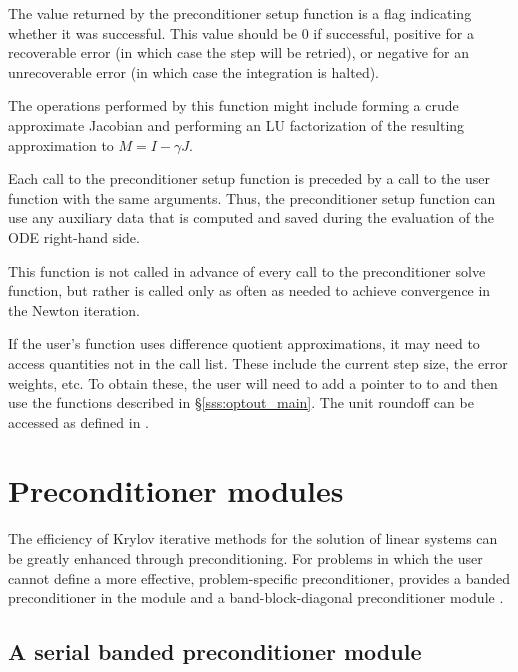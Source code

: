 {
  The value returned by the preconditioner setup function is a flag
  indicating whether it was successful.  This value should be $0$ if successful, 
  positive for a recoverable error (in which case the step will be retried), or
  negative for an unrecoverable error (in which case the integration is halted). 
}
{
  The operations performed by this function might include forming a crude 
  approximate Jacobian and performing an LU factorization of the resulting
  approximation to $M=I - \gamma J$.

  Each call to the preconditioner setup function is preceded by a call to     
  the  user function with the same  arguments.  
  Thus, the preconditioner setup function can use any auxiliary data that is 
  computed and saved during the evaluation of the ODE right-hand side.
  
  This function is not called in advance of every call to the preconditioner
  solve function, but rather is called only as often as needed to achieve
  convergence in the Newton iteration. 

  If the user's  function uses difference quotient
  approximations, it may need to access quantities not in the call
  list. These include the current step size, the error weights, etc.
  To obtain these, the user will need to add a pointer to  
  to  and then use the  functions described in
  \S\ref{sss:optout_main}. The unit roundoff can be accessed as
   defined in .
}


\section{Preconditioner modules}\label{ss:preconds}

The efficiency of Krylov iterative methods for the solution of linear systems 
can be greatly enhanced through preconditioning. For problems in which the 
user cannot define a more effective, problem-specific preconditioner,
{\cvode} provides a banded preconditioner in the module {\cvbandpre} and
a band-block-diagonal preconditioner module {\cvbbdpre}.

\subsection{A serial banded preconditioner module}\label{sss:cvbandpre}

